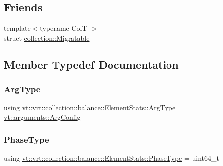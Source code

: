 \subsection*{Friends}
\begin{DoxyCompactItemize}
\item 
{\footnotesize template$<$typename ColT $>$ }\\struct \hyperlink{structvt_1_1vrt_1_1collection_1_1balance_1_1_element_stats_a7bbe05894c87d4c1c75375b8be72934d}{collection\+::\+Migratable}
\end{DoxyCompactItemize}


\subsection{Member Typedef Documentation}
\mbox{\label{structvt_1_1vrt_1_1collection_1_1balance_1_1_element_stats_a0c7e7b8fa38003b72320906f18a6ca71}} 
\subsubsection{\texorpdfstring{Arg\+Type}{ArgType}}
{\footnotesize\ttfamily using \hyperlink{structvt_1_1vrt_1_1collection_1_1balance_1_1_element_stats_a0c7e7b8fa38003b72320906f18a6ca71}{vt\+::vrt\+::collection\+::balance\+::\+Element\+Stats\+::\+Arg\+Type} =  \hyperlink{structvt_1_1arguments_1_1_arg_config}{vt\+::arguments\+::\+Arg\+Config}}

\mbox{\label{structvt_1_1vrt_1_1collection_1_1balance_1_1_element_stats_a6edee983bb2ae96a341763520af33c66}} 
\subsubsection{\texorpdfstring{Phase\+Type}{PhaseType}}
{\footnotesize\ttfamily using \hyperlink{structvt_1_1vrt_1_1collection_1_1balance_1_1_element_stats_a6edee983bb2ae96a341763520af33c66}{vt\+::vrt\+::collection\+::balance\+::\+Element\+Stats\+::\+Phase\+Type} =  uint64\+\_\+t}

